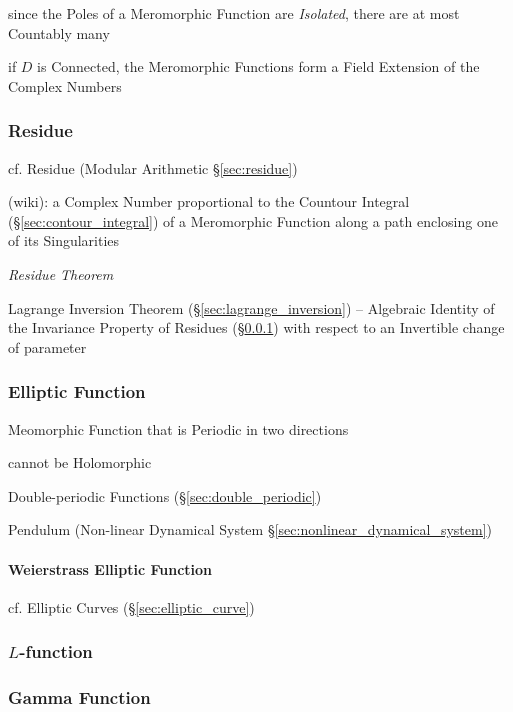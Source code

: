 since the Poles of a Meromorphic Function are \emph{Isolated}, there are at
most Countably many

if $D$ is Connected, the Meromorphic Functions form a Field Extension of the
Complex Numbers



\subsubsection{Residue}\label{sec:meromorphic_residue}

\fist cf. Residue (Modular Arithmetic \S\ref{sec:residue})

(wiki): a Complex Number proportional to the Countour Integral
(\S\ref{sec:contour_integral}) of a Meromorphic Function along a path enclosing
one of its Singularities

\emph{Residue Theorem}

Lagrange Inversion Theorem (\S\ref{sec:lagrange_inversion}) -- Algebraic
Identity of the Invariance Property of Residues
(\S\ref{sec:meromorphic_residue}) with respect to an Invertible change of
parameter



\subsubsection{Elliptic Function}\label{sec:elliptic_function}

Meomorphic Function that is Periodic in two directions

cannot be Holomorphic

Double-periodic Functions (\S\ref{sec:double_periodic})

Pendulum (Non-linear Dynamical System \S\ref{sec:nonlinear_dynamical_system})



\paragraph{Weierstrass Elliptic Function}\label{sec:weierstrass_elliptic}\hfill

cf. Elliptic Curves (\S\ref{sec:elliptic_curve})



\subsubsection{$L$-function}\label{sec:l_function}

\subsubsection{Gamma Function}\label{sec:gamma_function}

